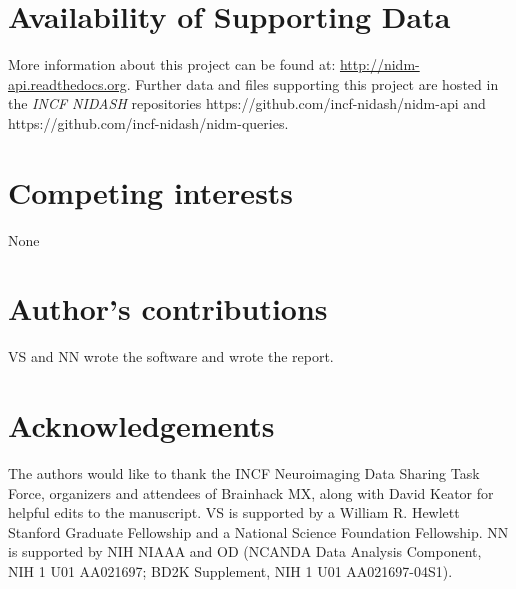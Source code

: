 \documentclass[twocolumn]{bmcart}%
\begin{document}
\begin{backmatter}

\section*{Availability of Supporting Data}
More information about this project can be found at: \url{http://nidm-api.readthedocs.org}. Further data and files supporting this project are hosted in the \emph{INCF NIDASH} repositories https://github.com/incf-nidash/nidm-api and https://github.com/incf-nidash/nidm-queries.

\section*{Competing interests}
None

\section*{Author's contributions}
VS and NN wrote the software and wrote the report.

\section*{Acknowledgements}
The authors would like to thank the INCF Neuroimaging Data Sharing Task Force, organizers and attendees of Brainhack MX, along with David Keator for helpful edits to the manuscript. VS is supported by a William R. Hewlett Stanford Graduate Fellowship and a National Science Foundation Fellowship. NN is supported by NIH NIAAA and OD (NCANDA Data Analysis Component, NIH 1 U01 AA021697; BD2K Supplement, NIH 1 U01 AA021697-04S1).
  


\end{backmatter}
\end{document}
